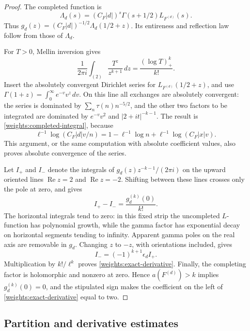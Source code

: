 \begin{proof}
The completed function is
\[
 \Lambda_d(s)=(C_F|d|)^s\Gamma(s+1/2)L_{F^{(d)}}(s).
\]
Thus \(g_d(z)=(C_F|d|)^{-1/2}\Lambda_d(1/2+z)\).
Its entireness and reflection law follow from those of \(\Lambda_d\).

For \(T>0\), Mellin inversion gives
\[
 \frac{1}{2\pi i}\int_{(2)}\frac{T^z}{z^{k+1}}\,dz
       =\frac{(\log T)_+^k}{k!}.
\]
Insert the absolutely convergent Dirichlet series for
\(L_{F^{(d)}}(1/2+z)\), and use
\(\Gamma(1+z)=\int_0^\infty e^{-v}v^z\,dv\).
On this line all exchanges are absolutely convergent: the series is
dominated by \(\sum_n\tau(n)n^{-5/2}\), and the other two factors to be
integrated are dominated by
\(e^{-v}v^2\) and \(|2+it|^{-k-1}\).
The result is \eqref{weights:completed-integral}, because
\[
 \ell^{-1}\log(C_F|d|v/n)
       =1-\ell^{-1}\log n+\ell^{-1}\log(C_F|x|v).
\]
This argument, or the same computation with absolute coefficient
values, also proves absolute convergence of the series.

Let \(I_+\) and \(I_-\) denote the integrals of
\(g_d(z)z^{-k-1}/(2\pi i)\) on the upward oriented lines
\(\operatorname{Re}z=2\) and \(\operatorname{Re}z=-2\).
Shifting between these lines crosses only the pole at zero, and gives
\[
 I_+-I_-=\frac{g_d^{(k)}(0)}{k!}.
\]
The horizontal integrals tend to zero: in this fixed strip the
uncompleted \(L\)-function has polynomial growth, while the gamma
factor has exponential decay on horizontal segments tending to
infinity. Apparent gamma poles on the real axis are removable in
\(g_d\). Changing \(z\) to \(-z\), with orientations included, gives
\[
 I_-=(-1)^{k+1}\epsilon_d I_+.
\]
Multiplication by \(k!/\ell^k\) proves
\eqref{weights:exact-derivative}. Finally, the completing factor is
holomorphic and nonzero at zero. Hence \(a(F^{(d)})>k\) implies
\(g_d^{(k)}(0)=0\), and the stipulated sign makes the coefficient on
the left of \eqref{weights:exact-derivative} equal to two.
\end{proof}

\subsection{Partition and derivative estimates}

